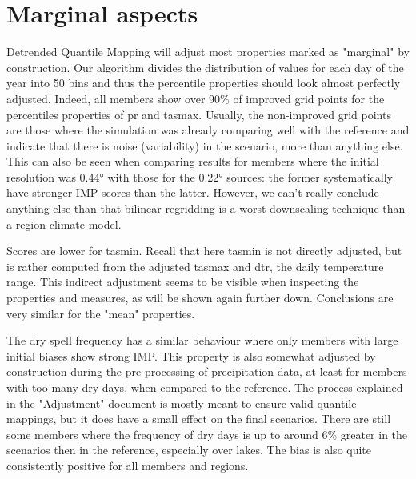 \documentclass[letterpaper,10pt]{article}
\begin{document}
\section{Marginal aspects}
Detrended Quantile Mapping will adjust most properties marked as "marginal" by construction. Our algorithm divides the distribution of values for each day of the year into 50 bins and thus the percentile properties should look almost perfectly adjusted. Indeed, all members show over 90\% of improved grid points for the percentiles properties of pr and tasmax. Usually, the non-improved grid points are those where the simulation was already comparing well with the reference and indicate that there is noise (variability) in the scenario, more than anything else. This can also be seen when comparing results for members where the initial resolution was 0.44° with those for the 0.22° sources: the former systematically have stronger IMP scores than the latter. However, we can't really conclude anything else than that bilinear regridding is a worst downscaling technique than a region climate model.

Scores are lower for tasmin. Recall that here tasmin is not directly adjusted, but is rather computed from the adjusted tasmax and dtr, the daily temperature range. This indirect adjustment seems to be visible when inspecting the properties and measures, as will be shown again further down. Conclusions are very similar for the "mean" properties.

The dry spell frequency has a similar behaviour where only members with large initial biases show strong IMP. This property is also somewhat adjusted by construction during the pre-processing of precipitation data, at least for members with too many dry days, when compared to the reference. The process explained in the "Adjustment" document is mostly meant to ensure valid quantile mappings, but it does have a small effect on the final scenarios. There are still some members where the frequency of dry days is up to around 6\% greater in the scenarios then in the reference, especially over lakes. The bias is also quite consistently positive for all members and regions.
\end{document}
